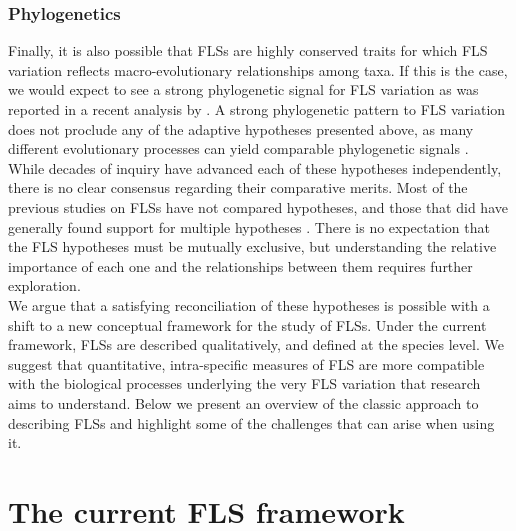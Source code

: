 \documentclass{article}
\begin{document}
\subsubsection*{Phylogenetics} 
\noindent Finally, it is also possible that FLSs are highly conserved traits for which FLS variation reflects macro-evolutionary relationships among taxa. If this is the case, we would expect to see a strong phylogenetic signal for FLS variation as was reported in a recent analysis by \citet{Gougherty2018}. A strong phylogenetic pattern to FLS variation does not proclude any of the adaptive hypotheses presented above, as  many different evolutionary processes can yield comparable phylogenetic signals \citep{Revell2008}. \\

\noindent While decades of inquiry have advanced each of these hypotheses independently, there is no clear consensus regarding their comparative merits. Most of the previous studies on FLSs have not compared hypotheses, and those that did have generally found support for multiple hypotheses \citep[see][]{Bolmgren2003,Gougherty2018}. There is no expectation that the FLS hypotheses must be mutually exclusive, but understanding the relative importance of each one and the relationships between them requires further exploration.\\

\noindent We argue that a satisfying reconciliation of these hypotheses is possible with a shift to a new conceptual framework for the study of FLSs. Under the current framework, FLSs are described qualitatively, and defined at the species level. We suggest that quantitative, intra-specific measures of FLS are more compatible with the biological processes underlying the very FLS variation that research aims to understand. Below we present an overview of the classic approach to describing FLSs and highlight some of the challenges that can arise when using it. \\

\section*{The current FLS framework}
\end{document}
